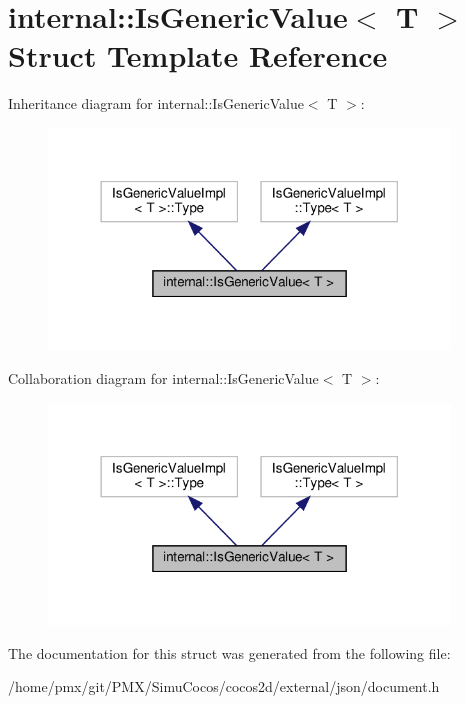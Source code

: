 \hypertarget{structinternal_1_1IsGenericValue}{}\section{internal\+:\+:Is\+Generic\+Value$<$ T $>$ Struct Template Reference}
\label{structinternal_1_1IsGenericValue}


Inheritance diagram for internal\+:\+:Is\+Generic\+Value$<$ T $>$\+:
\nopagebreak
\begin{figure}[H]
\begin{center}
\leavevmode
\includegraphics[width=302pt]{structinternal_1_1IsGenericValue__inherit__graph}
\end{center}
\end{figure}


Collaboration diagram for internal\+:\+:Is\+Generic\+Value$<$ T $>$\+:
\nopagebreak
\begin{figure}[H]
\begin{center}
\leavevmode
\includegraphics[width=302pt]{structinternal_1_1IsGenericValue__coll__graph}
\end{center}
\end{figure}


The documentation for this struct was generated from the following file\+:\begin{DoxyCompactItemize}
\item 
/home/pmx/git/\+P\+M\+X/\+Simu\+Cocos/cocos2d/external/json/document.\+h\end{DoxyCompactItemize}
